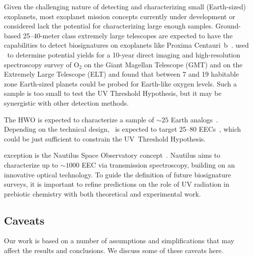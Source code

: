 \documentclass[twocolumn,twocolappendix,linenumbers]{aastex631}
\begin{document}
Given the challenging nature of detecting and characterizing small (Earth-sized) exoplanets, most exoplanet mission concepts currently under development or considered lack the potential for characterizing large enough samples.
Ground-based 25--40-meter class extremely large telescopes are expected to have the capabilities to detect biosignatures on exoplanets like Proxima Centauri~b~\citep[e.g.,][]{Wang2017,Hawker2019,Zhang2024,Vaughan2024}.
\citet{Hardegree-Ullman2025} used \bioverse\ to determine potential yields for a 10-year direct imaging and high-resolution spectroscopy survey of O$_2$ on the Giant Magellan Telescope (GMT) and on the Extremely Large Telescope (ELT) and found that between 7 and 19 habitable zone Earth-sized planets could be probed for Earth-like oxygen levels.
Such a sample is too small to test the UV Threshold Hypothesis, but it may be synergistic with other detection methods.

The \gls{HWO} is expected to characterize a sample of $\sim 25$ Earth analogs~\citep{Mamajek2023,Tuchow2024}.
Depending on the technical design, \life\ is expected to target 25--80 \glspl{EEC}~\citep{Kammerer2018,Quanz2022}, which could be just sufficient to constrain the UV~Threshold Hypothesis.

 exception is the Nautilus Space Observatory concept~\citep{Apai2019,Apai2022}.
Nautilus aims to characterize up to $\sim 1000$ \gls{EEC} via transmission spectroscopy, building on an innovative optical technology.
To guide the definition of future biosignature surveys, it is important to refine predictions on the role of \gls{UV} radiation in prebiotic chemistry with both theoretical and experimental work.



\subsection{Caveats}
Our work is based on a number of assumptions and simplifications that may affect the results and conclusions.
We discuss some of these caveats here.

\end{document}
